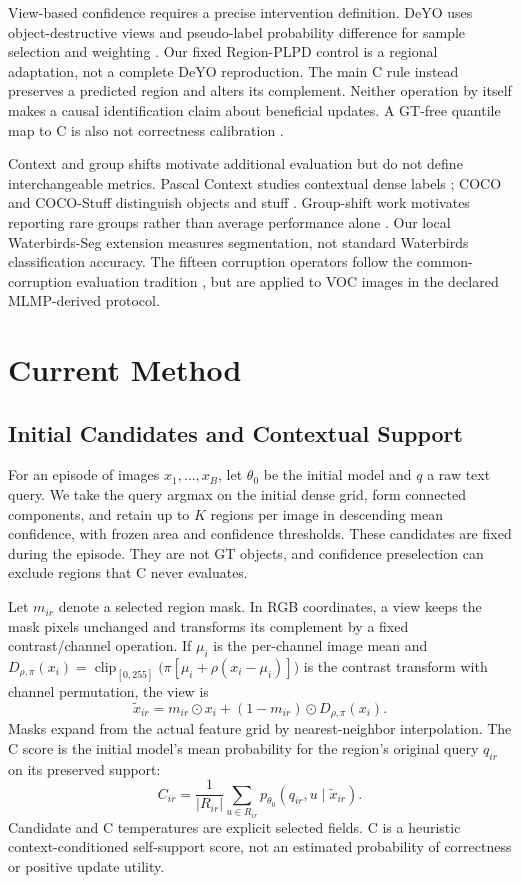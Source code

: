 \documentclass[10pt,twocolumn]{article}
\begin{document}
View-based confidence requires a precise intervention definition. DeYO uses
object-destructive views and pseudo-label probability difference for sample
selection and weighting \citep{lee2024deyo}. Our fixed Region-PLPD control is
a regional adaptation, not a complete DeYO reproduction. The main C rule
instead preserves a predicted region and alters its complement. Neither
operation by itself makes a causal identification claim about beneficial
updates. A GT-free quantile map to C is also not correctness calibration
\citep{guo2017calibration}.

Context and group shifts motivate additional evaluation but do not define
interchangeable metrics. Pascal Context studies contextual dense labels
\citep{mottaghi2014context}; COCO and COCO-Stuff distinguish objects and stuff
\citep{lin2014coco,caesar2018cocostuff}. Group-shift work motivates reporting
rare groups rather than average performance alone \citep{sagawa2020dro}.
Our local Waterbirds-Seg extension measures segmentation, not standard
Waterbirds classification accuracy. The fifteen corruption operators follow
the common-corruption evaluation tradition \citep{hendrycks2019corruptions},
but are applied to VOC images in the declared MLMP-derived protocol.

\section{Current Method}
\subsection{Initial Candidates and Contextual Support}
For an episode of images $x_1,\ldots,x_B$, let $\theta_0$ be the initial
model and $q$ a raw text query. We take the query argmax on the initial dense
grid, form connected components, and retain up to $K$ regions per image in
descending mean confidence, with frozen area and confidence thresholds.
These candidates are fixed during the episode. They are not GT objects,
and confidence preselection can exclude regions that C never evaluates.

Let $m_{ir}$ denote a selected region mask. In RGB coordinates, a view keeps
the mask pixels unchanged and transforms its complement by a fixed
contrast/channel operation. If $\mu_i$ is the per-channel image mean and
$D_{\rho,\pi}(x_i)=\operatorname{clip}_{[0,255]}
\bigl(\pi[\mu_i+\rho(x_i-\mu_i)]\bigr)$ is the contrast transform with channel
permutation, the view is
\begin{equation}
 \widetilde x_{ir}=m_{ir}\odot x_i+
             (1-m_{ir})\odot D_{\rho,\pi}(x_i).
\end{equation}
Masks expand from the actual feature grid by nearest-neighbor interpolation.
The C score is the initial model's mean probability for the region's original
query $q_{ir}$ on its preserved support:
\begin{equation}
 C_{ir}=\frac{1}{|R_{ir}|}\sum_{u\in R_{ir}}
       p_{\theta_0}(q_{ir},u\mid\widetilde x_{ir}).
\end{equation}
Candidate and C temperatures are explicit selected fields. C is a heuristic
context-conditioned self-support score, not an estimated probability of
correctness or positive update utility.
\end{document}
